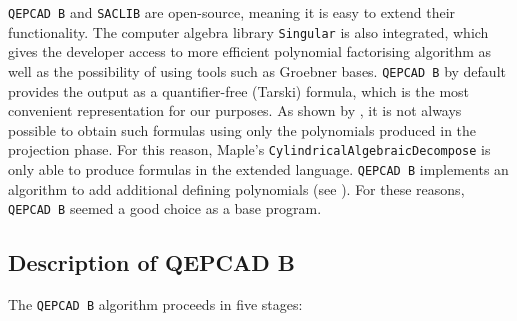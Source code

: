 \documentclass[
]{book}
\theoremstyle{definition}
\theoremstyle{definition}
\theoremstyle{definition}
\theoremstyle{definition}
\theoremstyle{remark}
\begin{document}
\texttt{QEPCAD\ B} and \texttt{SACLIB} are open-source, meaning it is easy to extend their functionality. The computer algebra library
\texttt{Singular} is also integrated, which gives the developer access to more efficient polynomial factorising algorithm as
well as the possibility of using tools such as Groebner bases. \texttt{QEPCAD\ B} by default provides the output as a
quantifier-free (Tarski) formula, which is the most convenient representation for our purposes. As shown by \citet{collins1975}, it is not always possible to obtain such formulas using only the polynomials produced in the projection phase.
For this reason, Maple's \texttt{CylindricalAlgebraicDecompose} is only able to produce formulas in the extended language. \texttt{QEPCAD\ B} implements an algorithm to add additional defining polynomials (see \citet{brown99}).
For these reasons, \texttt{QEPCAD\ B} seemed a good choice as a base program.

\hypertarget{description-of-qepcad-b}{%
\subsection{Description of QEPCAD B}\label{description-of-qepcad-b}}

The \texttt{QEPCAD\ B} algorithm proceeds in five stages:
\end{document}
